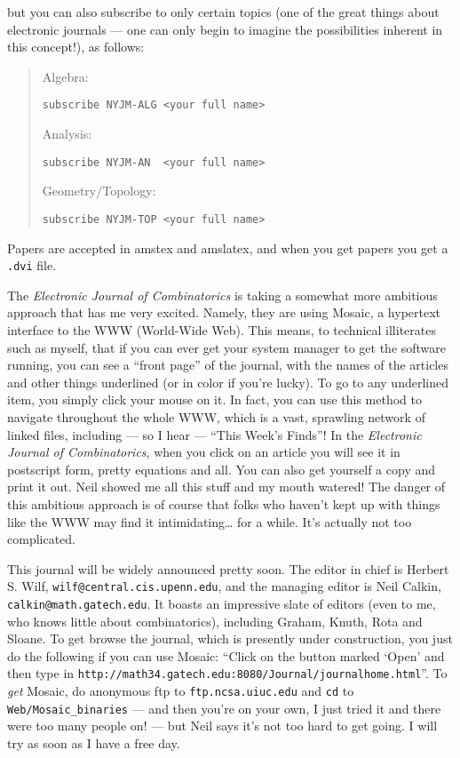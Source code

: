 \documentclass{article}
\begin{document}
but you can also subscribe to only certain topics (one of the great
things about electronic journals --- one can only begin to imagine the
possibilities inherent in this concept!), as follows:

\begin{quote}
Algebra:

\texttt{subscribe\ NYJM-ALG\ \textless{}your\ full\ name\textgreater{}}

Analysis:

\texttt{subscribe\ NYJM-AN\ \ \textless{}your\ full\ name\textgreater{}}

Geometry/Topology:

\texttt{subscribe\ NYJM-TOP\ \textless{}your\ full\ name\textgreater{}}
\end{quote}

Papers are accepted in amstex and amslatex, and when you get papers you
get a \texttt{.dvi} file.

The \emph{Electronic Journal of Combinatorics} is taking a somewhat more
ambitious approach that has me very excited. Namely, they are using
Mosaic, a hypertext interface to the WWW (World-Wide Web). This means,
to technical illiterates such as myself, that if you can ever get your
system manager to get the software running, you can see a ``front page''
of the journal, with the names of the articles and other things
underlined (or in color if you're lucky). To go to any underlined item,
you simply click your mouse on it. In fact, you can use this method to
navigate throughout the whole WWW, which is a vast, sprawling network of
linked files, including --- so I hear --- ``This Week's Finds''! In the
\emph{Electronic Journal of Combinatorics}, when you click on an article
you will see it in postscript form, pretty equations and all. You can
also get yourself a copy and print it out. Neil showed me all this stuff
and my mouth watered! The danger of this ambitious approach is of course
that folks who haven't kept up with things like the WWW may find it
intimidating\ldots{} for a while. It's actually not too complicated.

This journal will be widely announced pretty soon. The editor in chief
is Herbert S. Wilf, \texttt{wilf@central.cis.upenn.edu}, and the
managing editor is Neil Calkin, \texttt{calkin@math.gatech.edu}. It
boasts an impressive slate of editors (even to me, who knows little
about combinatorics), including Graham, Knuth, Rota and Sloane. To get
browse the journal, which is presently under construction, you just do
the following if you can use Mosaic: ``Click on the button marked `Open'
and then type in
\texttt{http://math34.gatech.edu:8080/Journal/journalhome.html}''. To
\emph{get} Mosaic, do anonymous ftp to \texttt{ftp.ncsa.uiuc.edu} and
\texttt{cd} to \texttt{Web/Mosaic\_binaries} --- and then you're on your
own, I just tried it and there were too many people on! --- but Neil
says it's not too hard to get going. I will try as soon as I have a free
day.
\end{document}
